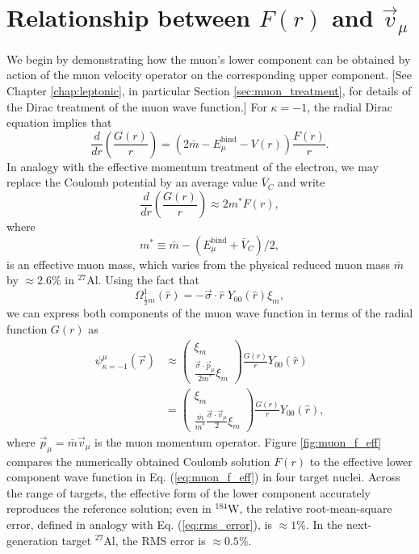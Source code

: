 \documentclass{book}[letterpaper,12pt]
\begin{document}
\section{Relationship between $F(r)$ and $\vec{v}_{\mu}$}
We begin by demonstrating how the muon's lower component can be obtained by action of the muon velocity operator on the corresponding upper component. [See Chapter \ref{chap:leptonic}, in particular Section \ref{sec:muon_treatment}, for details of the Dirac treatment of the muon wave function.] For $\kappa=-1$, the radial Dirac equation implies that
\begin{equation}
\frac{d}{dr}\left(\frac{G(r)}{r}\right)=\left(2\bar{m}-E^\mathrm{bind}_{\mu}-V(r)\right)\frac{F(r)}{r}.
\end{equation}
In analogy with the effective momentum treatment of the electron, we may replace the Coulomb potential by an average value $\bar{V}_C$ and write
\begin{equation}
\frac{d}{dr}\left(\frac{G(r)}{r}\right)\approx 2m^*F(r),
\end{equation}
where
\begin{equation}
m^*\equiv \bar{m}-\left(E^\mathrm{bind}_{\mu}+\bar{V}_C\right)/2,
\end{equation}
is an effective muon mass, which varies from the physical reduced muon mass $\bar{m}$ by $\approx 2.6$\% in $^{27}$Al. Using the fact that 
\begin{equation}
\Omega^1_{\frac{1}{2}m}(\hat{r})=-\vec{\sigma}\cdot\hat{r}\;Y_{00}(\hat{r})\xi_m,
\end{equation}
we can express both components of the muon wave function in terms of the radial function $G(r)$ as
\begin{equation}
\begin{split}
\psi^{\mu}_{\kappa=-1}(\vec{r})&\approx\left(\begin{array}{c}
\xi_m\\
\frac{\vec{\sigma}\cdot\vec{p}_{\mu}}{2m^*}\xi_m
\end{array}\right)\frac{G(r)}{r}Y_{00}(\hat{r})\\
&=\left(\begin{array}{c}
\xi_m\\
\frac{\bar{m}}{m^*}\frac{\vec{\sigma}\cdot\vec{v}_{\mu}}{2}\xi_m
\end{array}\right)\frac{G(r)}{r}Y_{00}(\hat{r}),
\end{split}
\label{eq:muon_f_eff}
\end{equation}
where $\vec{p}_{\mu}=\bar{m}\vec{v}_{\mu}$ is the muon momentum operator. Figure \ref{fig:muon_f_eff} compares the numerically obtained Coulomb solution $F(r)$ to the effective lower component wave function in Eq. (\ref{eq:muon_f_eff}) in four target nuclei. Across the range of targets, the effective form of the lower component accurately reproduces the reference solution; even in $^{184}$W, the relative root-mean-square error, defined in analogy with Eq. (\ref{eq:rms_error}), is $\approx 1\%$. In the next-generation target $^{27}$Al, the RMS error is $\approx 0.5\%$. 
\end{document}
